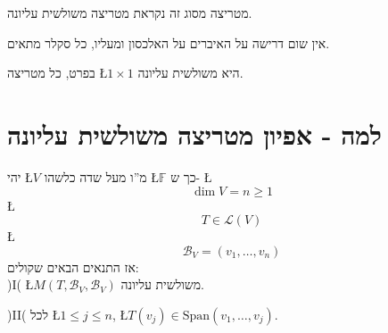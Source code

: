 \documentclass[english,hebrew]{article}
\begin{document}
מטריצה מסוג זה נקראת מטריצה משולשית עליונה.

אין שום דרישה על האיברים על האלכסון ומעליו, כל סקלר מתאים.

בפרט, כל מטריצה \L{$1\times1$} היא משולשית עליונה.

\section{למה - אפיון מטריצה משולשית עליונה}

יהי \L{$V$} מ\textquotedblright ו מעל שדה כלשהו \L{$\mathbb{F}$}
כך ש- \L{%
\[
\dim V=n\geq1
\]
}%
\L{%
\[
T\in\mathcal{L}(V)
\]
}%
\L{%
\[
\mathcal{B}_{V}=(v_{1},\dots,v_{n})
\]
}%
אז התנאים הבאים שקולים:\\

)I( \L{$M(T,\mathcal{B}_{V},\mathcal{B}_{V})$} משולשית עליונה.

)II( לכל \L{$1\leq j\leq n$}, \L{$T(v_{j})\in\text{Span}(v_{1},\dots,v_{j})$}.
\end{document}
